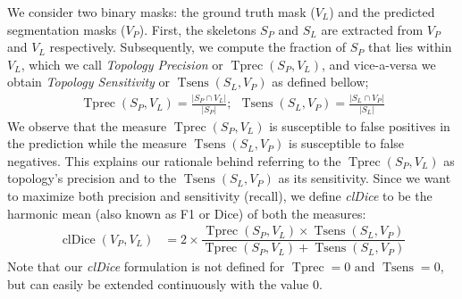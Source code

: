 We consider two binary masks: the ground truth mask ($V_L$) and the predicted segmentation masks ($V_P$). First, the skeletons $ S_P$ and $ S_L$ are extracted from $V_P$ and $V_L$ respectively. Subsequently, we compute the fraction of $S_P$ that lies within $V_L$, which we call \textit{Topology Precision} or $\operatorname{Tprec}(S_P, V_L)$, and vice-a-versa we obtain \textit{Topology Sensitivity} or $\operatorname{Tsens}(S_L, V_P)$ as defined bellow;
\begin{align}
\operatorname{Tprec}(S_P, V_L) = \frac{|S_P  \cap V_L|}{|S_P|};~~
\operatorname{Tsens}(S_L, V_P) = \frac{|S_L  \cap V_P|}{|S_L|}\label{top_def}
\end{align}
We observe that the measure $\operatorname{Tprec}(S_P, V_L)$ is susceptible to false positives in the prediction while the measure $\operatorname{Tsens}(S_L, V_P)$ is susceptible to false negatives. This explains our rationale behind referring to the $\operatorname{Tprec}(S_P, V_L)$ as topology's precision and to the $\operatorname{Tsens}(S_L, V_P)$ as its sensitivity. Since we want to maximize both precision and sensitivity (recall), we define \textit{clDice} to be the harmonic mean (also known as F1 or Dice) of both the measures:
\begin{align}
\operatorname{clDice}(V_P, V_L) & = 2 \times \dfrac{ \operatorname{Tprec}(S_P, V_L) \times \operatorname{Tsens}(S_L, V_P)}{\operatorname{Tprec}(S_P, V_L) + \operatorname{Tsens}(S_L, V_P)}\label{eq2}
\end{align}
Note that our \textit{clDice} formulation is not defined for $\operatorname{Tprec} = 0 \mbox{ and } \operatorname{Tsens} = 0$, but can easily be extended continuously with the value $0$.